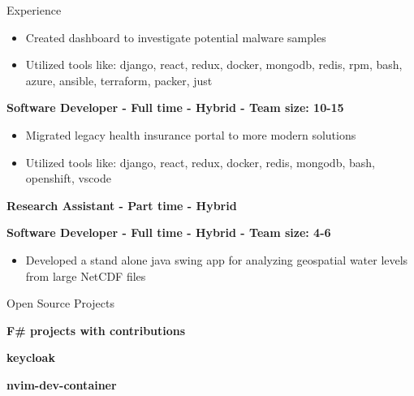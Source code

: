 \documentclass{resume} %
\begin{document}
\begin{rSection}{Experience}
\begin{itemize}
  \itemsep -2pt {}
      \item Created dashboard to investigate potential malware samples
    \item Utilized tools like: django, react, redux, docker, mongodb, redis, rpm, bash, azure, ansible, terraform, packer, just
\end{itemize}

\textbf{Software Developer - Full time - Hybrid - Team size: 10-15} \\

\begin{itemize}
  \itemsep -2pt {}
      \item Migrated legacy health insurance portal to more modern solutions
    \item Utilized tools like: django, react, redux, docker, redis, mongodb, bash, openshift, vscode
\end{itemize}

\textbf{Research Assistant - Part time - Hybrid} \\


\textbf{Software Developer - Full time - Hybrid - Team size: 4-6} \\

\begin{itemize}
  \itemsep -2pt {}
      \item Developed a stand alone java swing app for analyzing geospatial water levels from large NetCDF files
\end{itemize}

\end{rSection}


\begin{rSection}{Open Source Projects}
\vspace{-0.90em}
  \item \textbf{F\# projects with contributions} 
  \item \textbf{keycloak} 
  \item \textbf{nvim-dev-container} 
\end{rSection}
\end{document}
